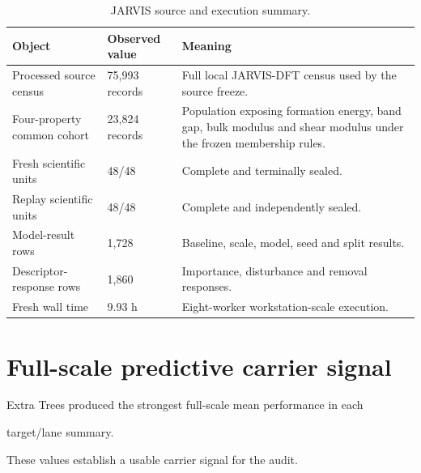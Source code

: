\documentclass[11pt,a4paper,oneside]{report}
\begin{document}
\begin{table}[H]



\centering



\caption{JARVIS source and execution summary.}



\label{tab:jarvis-summary}



\begin{tabularx}{\textwidth}{L{0.30\textwidth}
    L{0.20\textwidth}
    Y
}
\toprule
\textbf{Object}
&
\textbf{Observed value}
&
\textbf{Meaning}
\\
\midrule
Processed source census
&
75,993 records
&
Full local JARVIS-DFT census used by the source freeze.
\\
\addlinespace
Four-property common cohort
&
23,824 records
&
Population exposing formation energy,
band gap,
bulk modulus
and shear modulus under the frozen membership rules.
\\
\addlinespace
Fresh scientific units
&
48/48
&
Complete and terminally sealed.
\\
\addlinespace
Replay scientific units
&
48/48
&
Complete and independently sealed.
\\
\addlinespace
Model-result rows
&
1,728
&
Baseline,
scale,
model,
seed
and split results.
\\
\addlinespace
Descriptor-response rows
&
1,860
&
Importance,
disturbance
and removal responses.
\\
\addlinespace
Fresh wall time
&
9.93 h
&
Eight-worker workstation-scale execution.
\\
\bottomrule
\end{tabularx}



\end{table}





\section{Full-scale predictive carrier signal}



Extra Trees produced the strongest full-scale mean performance in each

target/lane summary.



These values establish a usable carrier signal for the audit.
\end{document}

